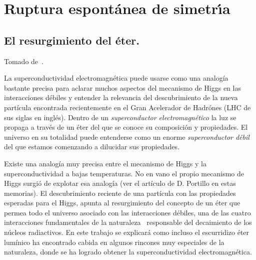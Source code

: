 \chapter{Ruptura espont\'anea de simetr\'\i a}
\label{rupt-espont-de} %


\section{El resurgimiento del éter.}

Tomado de~\cite{restrepo2013resurgimiento}.


  La superconductividad electromagnética puede usarse como una analogía bastante precisa para aclarar muchos aspectos del mecanismo de Higgs en las interacciones débiles y  entender la relevancia del descubrimiento de la nueva partícula encontrada recientemente en el Gran Acelerador de Hadrónes (LHC de sus siglas en inglés).  Dentro de un \emph{superconductor electromagnético} la luz se propaga a través de un éter del que se conoce su composición y propiedades. El universo en su totalidad puede entenderse como un enorme \emph{superconductor débil} del que estamos comenzando a dilucidar sus propiedades.


Existe una analogía muy precisa entre el mecanismo de Higgs y la superconductividad a bajas temperaturas. No en vano el propio mecanismo de Higgs surgió de explotar esa analogía (ver el artículo de D. Portillo en estas memorias). El descubrimiento reciente de una partícula con las propiedades esperadas para el Higgs, apunta al resurgimiento del concepto de  un éter que permea todo el universo asociado con las interacciones débiles, una de las cuatro interacciones fundamentales de la naturaleza~\cite{pi} responsable del decaimiento de los núcleos radiactivos. En este trabajo se explicará como incluso el escurridizo éter lumínico ha encontrado cabida en algunos rincones muy especiales de la naturaleza, donde se ha logrado obtener la superconductividad electromagnética.   

